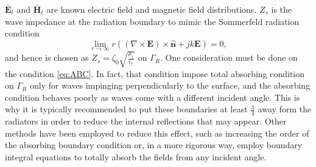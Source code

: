 \noindent $\bar{\mathbf{E}}_t$ and $\bar{\mathbf{H}}_t$ are known electric field and magnetic field distributions. $Z_s$ is the wave impedance at the radiation boundary to mimic the Sommerfeld radiation condition
$$\lim_{r \to \infty} r \left( (\nabla \times \mathbf{E}) \times \hat{\mathbf{n}} + j k \mathbf{E}\right) = 0,$$
\noindent and hence is chosen as $Z_s = \zeta_0 \sqrt{\frac{\mu_r}{\epsilon_r}}$ on $\Gamma_R$. One consideration must be done on the condition \eqref{eq:ABC}. In fact, that condition impose total absorbing condition on $\Gamma_R$ only for waves impinging perpendicularly to the surface, and the absorbing condition behaves poorly as waves come with a different incident angle. This is why it is typically recommended to put these boundaries at least $\frac{\lambda}{4}$ away form the radiators in order to reduce the internal reflections that may appear. Other methods have been employed to reduce this effect, such as increasing the order of the absorbing boundary condition \cite{jin2002finite} or, in a more rigorous way, employ boundary integral equations \cite{silvester1996finite} to totally absorb the fields from any incident angle.

